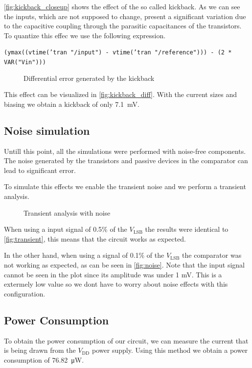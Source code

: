 \documentclass{article}
\newcommand*{\subb}[1]{\ensuremath{_{\mathrm{#1}}}}
\begin{document}
 \autoref{fig:kickback_closeup} shows the effect of the so called kickback. As we can see the inputs, which are not supposed to change, present a significant variation due to the capacitive coupling through the parasitic capacitances of the transistors.
 To quantize this effec we use the following expression.

 \texttt{(ymax((vtime('tran "/input") - vtime('tran "/reference"))) - (2 * VAR("Vin")))}\bigskip

 \begin{figure}[!h]
  \centering
  \caption{Differential error generated by the kickback}
  \label{fig:kickback_diff}
  
 \end{figure}

 This effect can be visualized in \autoref{fig:kickback_diff}.
 With the current sizes and biasing we obtain a kickback of only \SI{7.1}{\mV}.
 \subsection{Noise simulation}
 Untill this point, all the simulations were performed with noise-free components. The noise generated by the transistors and passive devices in the comparator can lead to significant error.

 To simulate this effects we enable the transient noise and we perform a transient analysis.

 \begin{figure}[!h]
  \centering
  \caption{Transient analysis with noise}
  \label{fig:noise}
  
 \end{figure}
  
 When using a input signal of 0.5\% of the $V\subb{LSB}$ the results were identical to \autoref{fig:transient}, this means that the circuit works as expected. 
 
 In the other hand, when using a signal of 0.1\% of the $V\subb{LSB}$ the comparator was not working as expected, as can be seen in \autoref{fig:noise}. Note that the input signal cannot be seen in the plot since its amplitude was under 1 mV. This is a extermely low value so we dont have to worry about noise effects with this configuration.
 \subsection{Power Consumption}
 To obtain the power consumption of our circuit, we can measure the current that is being drawn from the $V\subb{DD}$ power supply. Using this method we obtain a power consumption of \SI{76.82}{\uW}.
\end{document}

